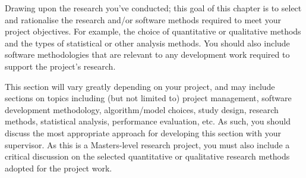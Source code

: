 Drawing upon the research you've conducted; this goal of this chapter is to select and rationalise the research and/or software methods required to meet your project objectives. For example, the choice of quantitative or qualitative methods and the types of statistical or other analysis methods. You should also include software methodologies that are relevant to any development work required to support the project’s research.

This section will vary greatly depending on your project, and may include sections on topics including (but not limited to) project management, software development methodology, algorithm/model choices, study design, research methods, statistical analysis, performance evaluation, etc. As such, you should discuss the most appropriate approach for developing this section with your supervisor. As this is a Masters-level research project, you must also include a critical discussion on the selected quantitative or qualitative research methods adopted for the project work.
